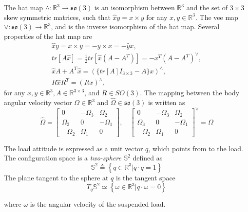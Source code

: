 The hat map $ \wedge:\mathbb{R}^3\rightarrow\mathfrak{so}(3) $ is an isomorphism between $ \mathbb{R}^3 $ and the set of $ 3\times 3 $ skew symmetric matrices, such that $ \hat{x}y=x\times y $ for any $ x,y \in \mathbb{R}^3 $. The vee map $ \vee:\mathfrak{so}(3)\rightarrow\mathbb{R}^3 $, and is the inverse isomorphism of the hat map. Several properties of the hat map are
\begin{eqnarray}
\hat{x}y=x\times y=-y\times x=-\hat{y}x,\\
tr[A\hat{x}]=\frac{1}{2}tr[\hat{x}(A-A^T)]=-x^T(A-A^T)^\vee,\label{eq:mod.hatvee}\\
\hat{x}A+A^T\hat{x}=(\{tr[A]I_{3\times 3}-A\}x)^\wedge, \label{eq:mod.hattrace}\\
R\hat{x}R^T=(Rx)^\wedge,
\end{eqnarray}
for any $ x,y\in\mathbb{R}^3, A\in\mathbb{R}^{3\times 3} $, and $ R\in SO(3) $.
The mapping between the body angular velocity vector $ \Omega\in\mathbb{R}^3 $ and  $ \hat{\Omega}\in\mathfrak{so}(3) $ is written as
\begin{equation}\label{eq:mod.hatOmega}
\hat{\Omega}=\begin{bmatrix}
0&-\Omega_3&\Omega_2\\
\Omega_3&0&-\Omega_1\\
-\Omega_2&\Omega_1&0
\end{bmatrix},
\quad
\begin{bmatrix}
0&-\Omega_3&\Omega_2\\
\Omega_3&0&-\Omega_1\\
-\Omega_2&\Omega_1&0
\end{bmatrix}^\vee = \Omega
\end{equation}

The load attitude is expressed as a unit vector $ q $, which points from \BF to the load. The configuration space is a \textit{two-sphere} $\mathbb{S}^2 $ defined as
\begin{equation}\label{key}
\mathbb{S}^2 \triangleq \left\lbrace q\in\mathbb{R}^{3}|q\cdot q=1\right\rbrace 
\end{equation}
The plane tangent to the sphere at $ q $ is the tangent space
\begin{equation}\label{key}
T_q\mathbb{S}^2 \simeq \left\lbrace \omega\in\mathbb{R}^{3}|q\cdot\omega=0\right\rbrace 
\end{equation}

where $ \omega $ is the angular velocity of the suspended load.
\newpage
